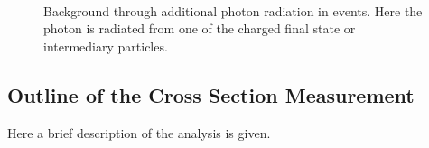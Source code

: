 \begin{figure}[ht]
 \\
  \caption{Background through additional photon radiation in \ttbar events. Here the photon is radiated from one of the charged final state or intermediary particles. \cite{tholen:ma} \cite{Hermanns:1292768}}
  \label{fig_ttg_bkg_fsr}
\end{figure}

\subsection{Outline of the \ttgamma Cross Section Measurement}

Here a brief description of the analysis is given.\\

